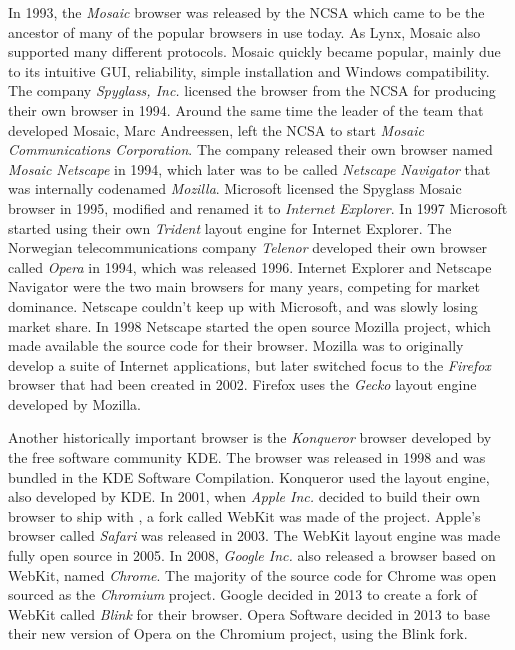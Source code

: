     In 1993, the \emph{Mosaic} \gls{browser} was released by the \gls{NCSA} which came to be the ancestor of many of the popular \glspl{browser} in use today.
    As Lynx, Mosaic also supported many different protocols.
    Mosaic quickly became popular, mainly due to its intuitive \gls{GUI}, reliability, simple installation and Windows compatibility.
    The company \emph{Spyglass, Inc.} licensed the \gls{browser} from the \gls{NCSA} for producing their own \gls{browser} in 1994.
    Around the same time the leader of the team that developed Mosaic, Marc Andreessen, left the \gls{NCSA} to start \emph{Mosaic Communications Corporation}.
    The company released their own \gls{browser} named \emph{Mosaic Netscape} in 1994, which later was to be called \emph{Netscape Navigator} that was internally codenamed \emph{Mozilla}.
    Microsoft licensed the Spyglass Mosaic \gls{browser} in 1995, modified and renamed it to \emph{Internet Explorer}.
    In 1997 Microsoft started using their own \emph{Trident} \gls{layout engine} for Internet Explorer.
    The Norwegian telecommunications company \emph{Telenor} developed their own \gls{browser} called \emph{Opera} in 1994, which was released 1996.
    Internet Explorer and Netscape Navigator were the two main \glspl{browser} for many years, competing for market dominance.
    Netscape couldn't keep up with Microsoft, and was slowly losing market share.
    In 1998 Netscape started the open source Mozilla project, which made available the source code for their \gls{browser}.
    Mozilla was to originally develop a suite of Internet applications, but later switched focus to the \emph{Firefox} \gls{browser} that had been created in 2002.
    Firefox uses the \emph{Gecko} \gls{layout engine} developed by Mozilla.

    Another historically important \gls{browser} is the \emph{Konqueror} \gls{browser} developed by the free software community \gls{KDE}.
    The \gls{browser} was released in 1998 and was bundled in the \gls{KDE} Software Compilation.
    Konqueror used the  \gls{layout engine}, also developed by \gls{KDE}.
    In 2001, when \emph{Apple Inc.} decided to build their own \gls{browser} to ship with , a \gls{fork} called \gls{WebKit} was made of the  project.
    Apple's \gls{browser} called \emph{Safari} was released in 2003.
    The \gls{WebKit} \gls{layout engine} was made fully open source in 2005.
    In 2008, \emph{Google Inc.} also released a \gls{browser} based on \gls{WebKit}, named \emph{Chrome}.
    The majority of the source code for Chrome was open sourced as the \emph{Chromium} project.
    Google decided in 2013 to create a \gls{fork} of \gls{WebKit} called \emph{Blink} for their \gls{browser}.
    Opera Software decided in 2013 to base their new version of Opera on the Chromium project, using the Blink \gls{fork}.